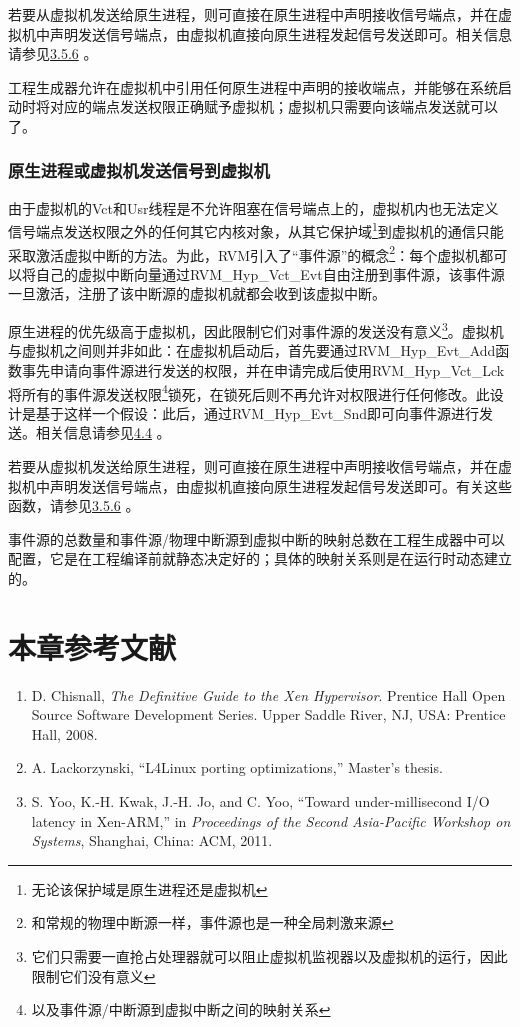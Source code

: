 若要从虚拟机发送给原生进程，则可直接在原生进程中声明接收信号端点，并在虚拟机中声明发送信号端点，由虚拟机直接向原生进程发起信号发送即可。相关信息请参见\protect\hyperref[subsec:3-5-6]{3.5.6}
。

工程生成器允许在虚拟机中引用任何原生进程中声明的接收端点，并能够在系统启动时将对应的端点发送权限正确赋予虚拟机；虚拟机只需要向该端点发送就可以了。

\subsubsection{原生进程或虚拟机发送信号到虚拟机}\label{subsubsec:2-2-7-3}

由于虚拟机的Vct和Usr线程是不允许阻塞在信号端点上的，虚拟机内也无法定义信号端点发送权限之外的任何其它内核对象，从其它保护域\footnote{无论该保护域是原生进程还是虚拟机}到虚拟机的通信只能采取激活虚拟中断的方法。为此，RVM引入了``事件源''的概念\footnote{和常规的物理中断源一样，事件源也是一种全局刺激来源}：每个虚拟机都可以将自己的虚拟中断向量通过RVM\_Hyp\_Vct\_Evt自由注册到事件源，该事件源一旦激活，注册了该中断源的虚拟机就都会收到该虚拟中断。

原生进程的优先级高于虚拟机，因此限制它们对事件源的发送没有意义\footnote{它们只需要一直抢占处理器就可以阻止虚拟机监视器以及虚拟机的运行，因此限制它们没有意义}。虚拟机与虚拟机之间则并非如此：在虚拟机启动后，首先要通过RVM\_Hyp\_Evt\_Add函数事先申请向事件源进行发送的权限，并在申请完成后使用RVM\_Hyp\_Vct\_Lck将所有的事件源发送权限\footnote{以及事件源/中断源到虚拟中断之间的映射关系}锁死，在锁死后则不再允许对权限进行任何修改。此设计是基于这样一个假设：此后，通过RVM\_Hyp\_Evt\_Snd即可向事件源进行发送。相关信息请参见\protect\hyperref[sec:4-4]{4.4}
。

若要从虚拟机发送给原生进程，则可直接在原生进程中声明接收信号端点，并在虚拟机中声明发送信号端点，由虚拟机直接向原生进程发起信号发送即可。有关这些函数，请参见\protect\hyperref[subsec:3-5-6]{3.5.6}
。

事件源的总数量和事件源/物理中断源到虚拟中断的映射总数在工程生成器中可以配置，它是在工程编译前就静态决定好的；具体的映射关系则是在运行时动态建立的。

\section{本章参考文献}\label{sec:2-3}

\begin{enumerate}
\def\labelenumi{{[}\arabic{enumi}{]}}
\item
  \protect{}\label{cite:2-1}
  D. Chisnall, \textit{The Definitive Guide to the Xen Hypervisor}.
  Prentice Hall Open Source Software Development Series. Upper Saddle
  River, NJ, USA: Prentice Hall, 2008.
\item
  \protect{}\label{cite:2-2}
  A. Lackorzynski, ``L4Linux porting optimizations,'' Master's thesis.
\item
  \protect{}\label{cite:2-3}
  S. Yoo, K.-H. Kwak, J.-H. Jo, and C. Yoo, ``Toward under-millisecond
  I/O latency in Xen-ARM,'' in \textit{Proceedings of the Second
  Asia-Pacific Workshop on Systems}, Shanghai, China: ACM, 2011.
\end{enumerate}

